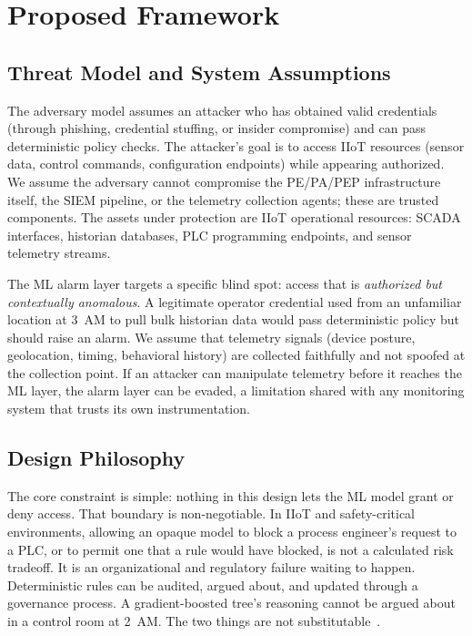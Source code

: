 \documentclass[conference]{IEEEtran}
\begin{document}
\section{Proposed Framework}

\subsection{Threat Model and System Assumptions}

The adversary model assumes an attacker who has obtained valid credentials (through phishing, credential stuffing, or insider compromise) and can pass deterministic policy checks. The attacker's goal is to access IIoT resources (sensor data, control commands, configuration endpoints) while appearing authorized. We assume the adversary cannot compromise the PE/PA/PEP infrastructure itself, the SIEM pipeline, or the telemetry collection agents; these are trusted components. The assets under protection are IIoT operational resources: SCADA interfaces, historian databases, PLC programming endpoints, and sensor telemetry streams.

The ML alarm layer targets a specific blind spot: access that is \textit{authorized but contextually anomalous}. A legitimate operator credential used from an unfamiliar location at 3~AM to pull bulk historian data would pass deterministic policy but should raise an alarm. We assume that telemetry signals (device posture, geolocation, timing, behavioral history) are collected faithfully and not spoofed at the collection point. If an attacker can manipulate telemetry before it reaches the ML layer, the alarm layer can be evaded, a limitation shared with any monitoring system that trusts its own instrumentation.

\subsection{Design Philosophy}

The core constraint is simple: nothing in this design lets the ML model grant or deny access. That boundary is non-negotiable. In IIoT and safety-critical environments, allowing an opaque model to block a process engineer's request to a PLC, or to permit one that a rule would have blocked, is not a calculated risk tradeoff. It is an organizational and regulatory failure waiting to happen. Deterministic rules can be audited, argued about, and updated through a governance process. A gradient-boosted tree's reasoning cannot be argued about in a control room at 2~AM. The two things are not substitutable~\cite{nist800207, ehrlich2021}.
\end{document}
